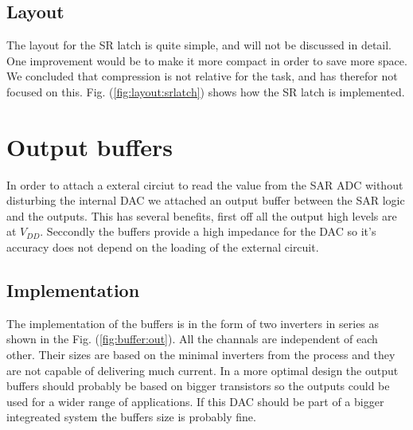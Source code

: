 \documentclass[english, 12pt, a4paper]{ifimaster}
\begin{document}
\subsection{Layout}
The layout for the SR latch is quite simple, and will not be discussed in detail. One improvement would be to make it more compact in order to save more space. 
We concluded that compression is not relative for the task, and has therefor not focused on this. Fig. (\ref{fig:layout:srlatch}) shows how the SR latch is implemented. 




\section{Output buffers}
In order to attach a exteral circiut to read the value from the SAR ADC without disturbing the internal DAC we attached an output buffer between the SAR logic and the outputs.
This has several benefits, first off all the output high levels are at \(V_{DD}\). Seccondly the buffers provide a high impedance for the DAC so it's accuracy does not depend on the loading of the external circuit.

\subsection{Implementation}
The implementation of the buffers is in the form of two inverters in series as shown in the Fig. (\ref{fig:buffer:out}). All the channals are independent of each other. 
Their sizes are based on the minimal inverters from the process and they are not capable of delivering much current. 
In a more optimal design the output buffers should probably be based on bigger transistors so the outputs could be used for a wider range of applications. If this DAC should be part of a bigger integreated system
the buffers size is probably fine.
\end{document}
